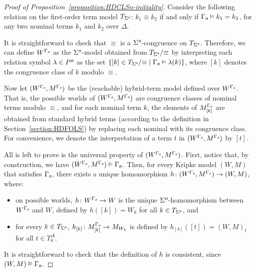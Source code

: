 \documentclass[a4paper,UKenglish,cleveref,autoref]{lipics-v2019}
\begin{document}
\begin{proof}[Proof of Proposition~\ref{proposition:HDCLSn-initiality}]
  Consider the following relation on the first-order term model \(T_{\Sigma^{\text{\normalfont\sffamily\itshape n}}}\):
  \(k_{1} \equiv k_{2}\) if and only if \(\Gamma_{\text{\normalfont\sffamily\itshape n}} \vDash k_{1} = k_{2}\), for any two nominal terms \(k_{1}\) and \(k_{2}\) over \(\Delta\).

  It is straightforward to check that \(\equiv\) is a \(\Sigma^{\text{\normalfont\sffamily\itshape n}}\)-congruence on \(T_{\Sigma^{\text{\normalfont\sffamily\itshape n}}}\).
  Therefore, we can define \(W^{\Gamma_{\text{\normalfont\sffamily\itshape n}}}\) as the \(\Sigma^{\text{\normalfont\sffamily\itshape n}}\)-model obtained from \(T_{\Sigma^{\text{\normalfont\sffamily\itshape n}}} /{\equiv}\) by interpreting each relation symbol \(\lambda \in P^{\text{\normalfont\sffamily\itshape n}}\) as the set \(\{ [k] \in T_{\Sigma^{\text{\normalfont\sffamily\itshape n}}} /{\equiv} \mid \Gamma_{\text{\normalfont\sffamily\itshape n}} \vDash \lambda(k) \}\), where \([k]\) denotes the congruence class of \(k\) modulo \(\equiv\).

  Now let \((W^{\Gamma_{\text{\normalfont\sffamily\itshape n}}}, M^{\Gamma_{\text{\normalfont\sffamily\itshape n}}})\) be the (reachable) hybrid-term model defined over \(W^{\Gamma_{\text{\normalfont\sffamily\itshape n}}}\).
  That is, the possible worlds of \((W^{\Gamma_{\text{\normalfont\sffamily\itshape n}}}, M^{\Gamma_{\text{\normalfont\sffamily\itshape n}}})\) are congruence classes of nominal terms modulo \(\equiv\), and for each nominal term \(k\), the elements of \(M^{\Gamma_{\text{\normalfont\sffamily\itshape n}}}_{[k]}\) are obtained from standard hybrid terms (according to the definition in Section~\ref{section:HDFOLS}) by replacing each nominal with its congruence class.
  For convenience, we denote the interpretation of a term \(t\) in \((W^{\Gamma_{\text{\normalfont\sffamily\itshape n}}}, M^{\Gamma_{\text{\normalfont\sffamily\itshape n}}})\) by \([t]\).

  All is left to prove is the universal property of \((W^{\Gamma_{\text{\normalfont\sffamily\itshape n}}}, M^{\Gamma_{\text{\normalfont\sffamily\itshape n}}})\).
  First, notice that, by construction, we have \((W^{\Gamma_{\text{\normalfont\sffamily\itshape n}}}, M^{\Gamma_{\text{\normalfont\sffamily\itshape n}}}) \vDash \Gamma_{\text{\normalfont\sffamily\itshape n}}\).
  Then, for every Kripke model \((W, M)\) that satisfies \(\Gamma_{\text{\normalfont\sffamily\itshape n}}\), there exists a unique homomorphism \(h \colon (W^{\Gamma_{\text{\normalfont\sffamily\itshape n}}}, M^{\Gamma_{\text{\normalfont\sffamily\itshape n}}}) \to (W, M)\), where:
  \begin{itemize}
  \item on possible worlds, \(h \colon W^{\Gamma_{\text{\normalfont\sffamily\itshape n}}} \to W\) is the unique \(\Sigma^{\text{\normalfont\sffamily\itshape n}}\)-homomorphism between \(W^{\Gamma_{\text{\normalfont\sffamily\itshape n}}}\) and \(W\), defined by \(h([k]) = W_{k}\) for all \(k \in T_{\Sigma^{\text{\normalfont\sffamily\itshape n}}}\), and 

  \item for every \(k \in T_{\Sigma^{\text{\normalfont\sffamily\itshape n}}}\), \(h_{[k]} \colon M^{\Gamma_{\text{\normalfont\sffamily\itshape n}}}_{[k]} \to M_{W_{k}}\) is defined by \(h_{[k]}([t]) = (W, M)_{t}\) for all \(t \in T^{\Delta}_{k}\).
  \end{itemize}
  It is straightforward to check that the definition of \(h\) is consistent, since \((W, M) \vDash \Gamma_{\text{\normalfont\sffamily\itshape n}}\).
\end{proof}
\end{document}
